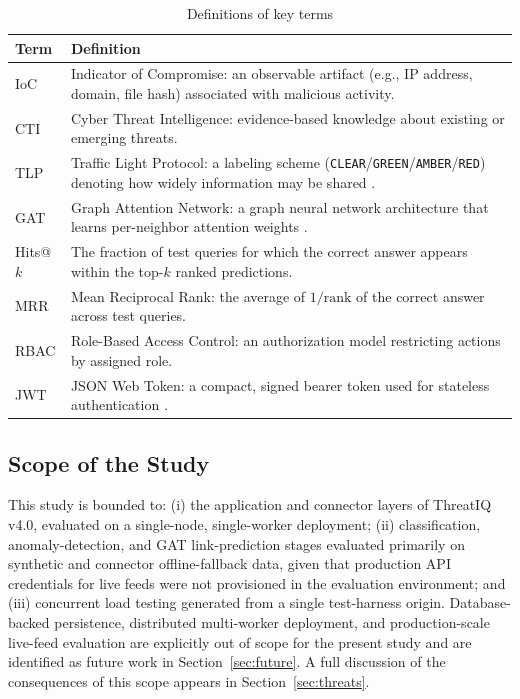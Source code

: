 \documentclass[conference]{IEEEtran}
\begin{document}
\begin{table}[h]
\caption{Definitions of key terms}
\label{tab:definitions}
\centering
\begin{tabular}{@{}p{1.6cm}p{6.3cm}@{}}
\toprule
\textbf{Term} & \textbf{Definition} \\
\midrule
IoC & Indicator of Compromise: an observable artifact (e.g., IP address, domain, file hash) associated with malicious activity. \\
CTI & Cyber Threat Intelligence: evidence-based knowledge about existing or emerging threats. \\
TLP & Traffic Light Protocol: a labeling scheme (\texttt{CLEAR}/\texttt{GREEN}/\texttt{AMBER}/\texttt{RED}) denoting how widely information may be shared \cite{first_tlp}. \\
GAT & Graph Attention Network: a graph neural network architecture that learns per-neighbor attention weights \cite{velickovic2018gat}. \\
Hits@$k$ & The fraction of test queries for which the correct answer appears within the top-$k$ ranked predictions. \\
MRR & Mean Reciprocal Rank: the average of $1/\text{rank}$ of the correct answer across test queries. \\
RBAC & Role-Based Access Control: an authorization model restricting actions by assigned role. \\
JWT & JSON Web Token: a compact, signed bearer token used for stateless authentication \cite{rfc7519}. \\
\bottomrule
\end{tabular}
\end{table}

\subsection{Scope of the Study}
\label{sec:scope}
This study is bounded to: (i) the application and connector layers of ThreatIQ v4.0, evaluated on a single-node, single-worker deployment; (ii) classification, anomaly-detection, and GAT link-prediction stages evaluated primarily on synthetic and connector offline-fallback data, given that production API credentials for live feeds were not provisioned in the evaluation environment; and (iii) concurrent load testing generated from a single test-harness origin. Database-backed persistence, distributed multi-worker deployment, and production-scale live-feed evaluation are explicitly out of scope for the present study and are identified as future work in Section~\ref{sec:future}. A full discussion of the consequences of this scope appears in Section~\ref{sec:threats}.
\end{document}

